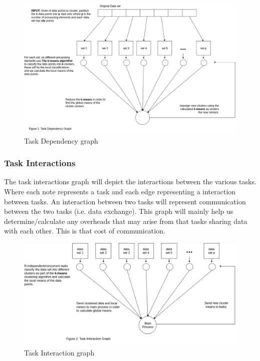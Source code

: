 \documentclass[12pt]{article}
\begin{document}
    			\begin{figure}
    				\begin{center}
    					\includegraphics[scale=0.3]{task_dependency_graph_2.png}
    				\end{center}
    				\caption{Task Dependency graph}
    			\end{figure}
    		
    		\subsubsection{Task Interactions}
    			\begin{flushleft}
    				The task interactions graph will depict the interactions between the various tasks. Where each note represents a task and each edge representing a interaction between tasks. An interaction between two tasks will represent communication between the two tasks (i.e. data exchange). This graph will mainly help us determine/calculate any overheads that may arise from that tasks sharing data with each other. This is that cost of communication.
    			\end{flushleft}
    			
    			\begin{figure}
    				\begin{center}
    					\includegraphics[scale=0.3]{task_interaction_1.png}
    				\end{center}
    				\caption{Task Interaction graph}
    			\end{figure}
    			
\end{document}
